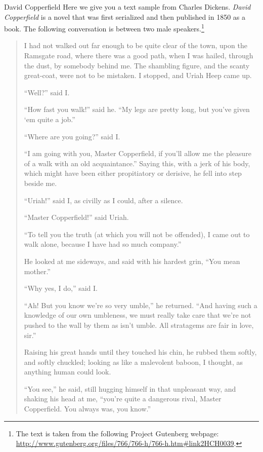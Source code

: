 \begin{texts}{David Copperfield}
Here we give you a text sample from Charles Dickens. \textit{David Copperfield} is a novel that was first serialized and then published in 1850 as a book. The following conversation is between two male speakers.\footnote{The text is taken from the following Project Gutenberg webpage: \url{http://www.gutenberg.org/files/766/766-h/766-h.htm\#link2HCH0039}.}

\begin{quote}
    \internallinenumbers*{}
    I had not walked out far enough to be quite clear of the town, upon the Ramsgate road, where there was a good path, when I was hailed, through the dust, by somebody behind me. The shambling figure, and the scanty great-coat, were not to be mistaken. I stopped, and Uriah Heep came up.
    
    ``Well?'' said I.
    
    ``How fast you walk!'' said he. ``My legs are pretty long, but you've given ‘em quite a job.''
    
    ``Where are you going?'' said I.
    
    ``I am going with you, Master Copperfield, if you'll allow me the pleasure of a walk with an old acquaintance.'' Saying this, with a jerk of his body, which might have been either propitiatory or derisive, he fell into step beside me.
    
    ``Uriah!'' said I, as civilly as I could, after a silence.
    
    ``Master Copperfield!'' said Uriah.
    
    ``To tell you the truth (at which you will not be offended), I came out to walk alone, because I have had so much company.''
    
    He looked at me sideways, and said with his hardest grin, ``You mean mother.''
    
    ``Why yes, I do,'' said I.
    
    ``Ah! But you know we're so very umble,'' he returned. ``And having such a knowledge of our own umbleness, we must really take care that we're not pushed to the wall by them as isn't umble. All stratagems are fair in love, sir.''
    
    Raising his great hands until they touched his chin, he rubbed them softly, and softly chuckled; looking as like a malevolent baboon, I thought, as anything human could look.
    
    ``You see,'' he said, still hugging himself in that unpleasant way, and shaking his head at me, ``you're quite a dangerous rival, Master Copperfield. You always was, you know.''
    

\end{quote}
\end{texts}
